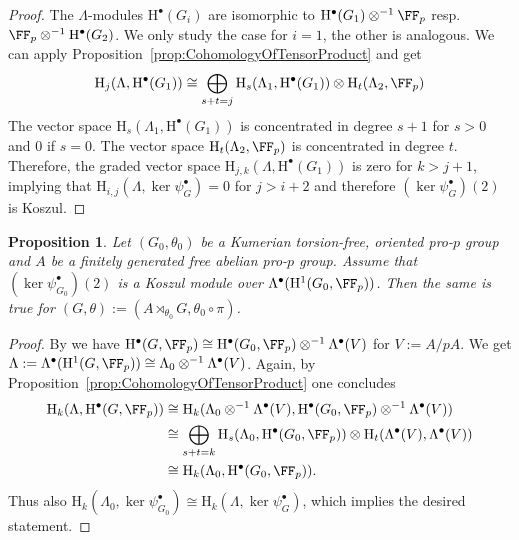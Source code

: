 \documentclass{amsart}
\newtheorem{prop}[thm]{Proposition}
\theoremstyle{definition}
\theoremstyle{remark}
\newcommand{\rmH}{\mathrm{H}}
\numberwithin{equation}{section}
\begin{document}
\begin{proof}
    The $\Lambda$-modules $\rmH^\bullet(G_i)$ are isomorphic to $\rmH^\bullet(G_1)\otimes^{-1}\FF_p$ resp. $\FF_p\otimes^{-1}\rmH^\bullet(G_2)$. We only study the case for $i=1$, the other is analogous. We can apply Proposition~\ref{prop:CohomologyOfTensorProduct} and get
    \begin{align*}
        \rmH_j(\Lambda,\rmH^\bullet(G_1))\cong \bigoplus_{s+t=j}\rmH_s({\Lambda_1},\rmH^\bullet(G_1))\otimes \rmH_t({\Lambda_2},\FF_p)
    \end{align*}
    The vector space $\rmH_s({\Lambda_1},\rmH^\bullet(G_1))$ is concentrated in degree $s+1$ for $s>0$ and $0$ if $s=0$. The vector space $\rmH_t({\Lambda_2},\FF_p)$ is concentrated in degree $t$. Therefore, the graded vector space $\rmH_{j,k}(\Lambda,\rmH^\bullet(G_1))$ is zero for $k>j+1$, implying that $\rmH_{i,j}(\Lambda,\ker\psi_G^\bullet)=0$ for $j>i+2$ and therefore $(\ker \psi_G^\bullet)(2)$ is Koszul.
\end{proof}
\begin{prop}
\label{prop:SemiDirectKoszul}
    Let $(G_0,\theta_0)$ be a Kumerian torsion-free, oriented pro-$p$ group and $A$ be a finitely generated free abelian pro-$p$ group. Assume that $(\ker \psi_{G_0}^\bullet)(2)$ is a Koszul module over $\Lambda^\bullet(\rmH^1(G_0,\FF_p))$. Then the same is true for $(G,\theta):=(A\rtimes_{\theta_0}G,\theta_0\circ \pi)$.
\end{prop}
\begin{proof}
    By \cite[Proposition 5.8]{MinacPasiniQuadrelliTan2021} we have $\rmH^\bullet(G,\FF_p)\cong \rmH^\bullet(G_0,\FF_p)\otimes^{-1}\Lambda^\bullet(V)$ for $V:=A/pA$. We get $\Lambda:=\Lambda^\bullet(\rmH^1(G,\FF_p))\cong \Lambda_0\otimes^{-1} \Lambda^\bullet(V)$. Again, by Proposition~\ref{prop:CohomologyOfTensorProduct} one concludes
    \begin{align*}
        \rmH_k(\Lambda,\rmH^\bullet(G,\FF_p))&\cong \rmH_k({\Lambda_0\otimes^{-1} \Lambda^\bullet(V)},\rmH^\bullet(G_0,\FF_p)\otimes^{-1}\Lambda^\bullet(V))\\
        &\cong \bigoplus_{s+t=k} \rmH_s(\Lambda_0,\rmH^\bullet(G_0,\FF_p))\otimes \rmH_t({\Lambda^\bullet(V)},\Lambda^\bullet(V))\\
        &\cong \rmH_k(\Lambda_0,\rmH^\bullet(G_0,\FF_p)).
    \end{align*}
    Thus also $\rmH_k(\Lambda_0,\ker \psi_{G_0}^\bullet)\cong \rmH_k(\Lambda,\ker\psi_G^\bullet)$, which implies the desired statement.
\end{proof}
\end{document}
